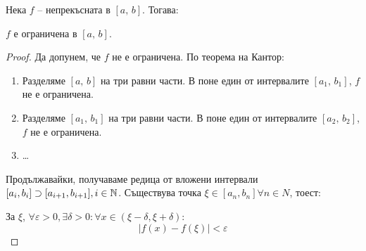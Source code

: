 

Нека $f$ -- непрекъсната в $\left[a,\,b\right]$. Тогава:

\begin{theorem}
    $f$ е ограничена в $\left[a,\,b\right]$.

    \begin{proof}
        Да допунем, че $f$ не е ограничена. По теорема на Кантор:

        \begin{enumerate}
            \item Разделяме $\left[a,\,b\right]$ на три равни части.
                  В поне един от интервалите $\left[a_1,\,b_1\right]$, $f$ не е ограничена.
            \item Разделяме $\left[a_1,\,b_1\right]$ на три равни части.
                  В поне един от интервалите $\left[a_2,\,b_2\right]$, $f$ не е ограничена.
            \item \dots
        \end{enumerate}
        Продължавайки, получаваме редица от вложени интервали $[a_i,b_i] \supset [a_{i+1},b_{i+1}], i \in \mathbb{N}$.
        Съществува точка $\xi \in [a_n, b_n] \forall n \in N$, тоест:

        За $\xi$, $\forall \varepsilon > 0, \exists \delta > 0: \forall x \in (\xi-\delta, \xi+\delta)$:
        \[\left|f(x) - f(\xi)\right| < \varepsilon\]
    \end{proof}
\end{theorem}